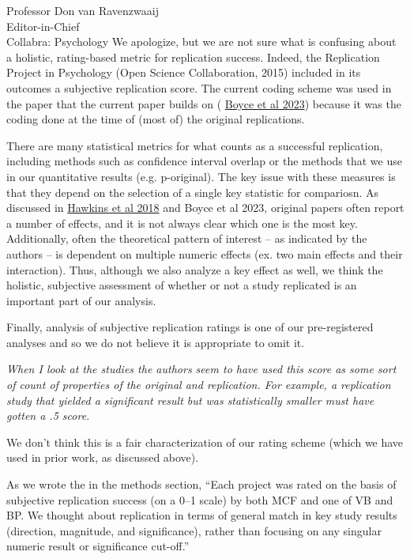 \documentclass{stanfordletter}
\newcounter{section}
\newcommand{\theysaid}[1]{\begin{leftbar} \noindent 
		\textsl{ #1}\end{leftbar}}
\begin{document}
\begin{letter}{Professor Don van Ravenzwaaij \\ Editor-in-Chief \\ Collabra: Psychology }
	We apologize, but we are not sure what is confusing about a holistic, rating-based metric for replication success. Indeed, the Replication Project in Psychology (Open Science Collaboration, 2015) included in its outcomes a subjective replication score. The current coding scheme was used in the paper that the current paper builds on ( \href{https://royalsocietypublishing.org/doi/full/10.1098/rsos.231240}{Boyce et al 2023}) because it was the coding done at the time of (most of) the original replications. 
	
	There are many statistical metrics for what counts as a successful replication, including methods such as confidence interval overlap or the methods that we use in our quantitative results (e.g. p-original). The key issue with these measures is that they depend on the selection of a single key statistic for compariosn. As discussed in \href{https://journals.sagepub.com/doi/full/10.1177/2515245917740427}{Hawkins et al 2018} and Boyce et al 2023, original papers often report a number of effects, and it is not always clear which one is the most key. Additionally, often the theoretical pattern of interest -- as indicated by the authors -- is dependent on multiple numeric effects (ex. two main effects and their interaction). Thus, although we also analyze a key effect as well, we think the holistic, subjective assessment of whether or not a study replicated is an important part of our analysis.
	
	Finally, analysis of subjective replication ratings is one of our pre-registered analyses and so we do not believe it is appropriate to omit it. 
	
	
	
	
	\theysaid{ When I look at the studies the authors seem to have used this score as some sort of count of properties of the original and replication. For example, a replication study that yielded a significant result but was statistically smaller must have gotten a .5 score. }
	
	We don't think this is a fair characterization of our rating scheme (which we have used in prior work, as discussed above). 
	
	As we wrote the in the methods section, ``Each project was rated on the basis of subjective replication success (on a 0--1 scale) by both MCF and one of VB and BP.
	We thought about replication in terms of general match in key study results (direction, magnitude, and significance), rather than focusing on any singular numeric result or significance cut-off.''
	

\end{letter}
\end{document}
